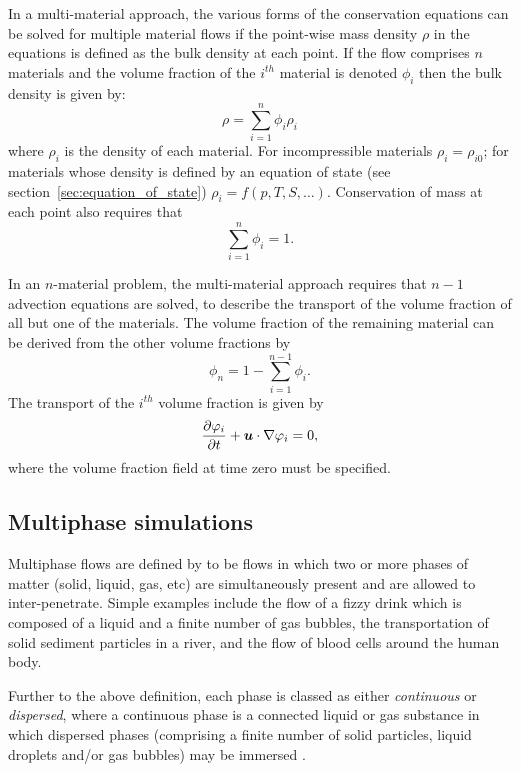 In a multi-material approach, the various forms of the conservation equations can be solved for multiple material flows if the point-wise mass density $\rho$ in the equations is defined as the bulk density at each point.  If the flow comprises $n$ materials and the volume fraction of the $i^{th}$ material is denoted $\phi_i$ then the bulk density is given by:
\begin{equation}
\rho = \sum_{i=1}^n \phi_i\rho_i
\end{equation}
where $\rho_i$ is the density of each material.  For incompressible materials $\rho_i = \rho_{i0}$; for materials whose density is defined by an equation of state (see section~\ref{sec:equation_of_state}) $\rho_i = f(p,T,S,\ldots)$.  Conservation of mass at each point also requires that
\begin{equation}
\sum_{i=1}^n \phi_{i} = 1.
\end{equation}

In an $n$-material problem, the multi-material approach requires that $n-1$ advection equations are solved, to describe the transport of the volume fraction of all but one of the materials.  The volume fraction of the remaining material can be derived from the other volume fractions by
\begin{equation}\label{diagnosticvolfrac}
\phi_{n} = 1 - \sum_{i=1}^{n-1}\phi_{i}. 
\end{equation}
The transport of the $i^{th}$ volume fraction is given by  
\begin{equation}
\frac{\partial\varphi_i}{\partial t} + {\mbox{\boldmath$u$}}\cdot\nabla\varphi_i = 0,
\end{equation}
where the volume fraction field at time zero must be specified.

\subsection{Multiphase simulations}
\label{sec:multiphase_equations}
Multiphase flows are defined by \cite{prosperettiEtAl2007} to be flows in which two or more phases of matter (solid, liquid, gas, etc) are simultaneously present and are allowed to inter-penetrate. Simple examples include the flow of a fizzy drink which is composed of a liquid and a finite number of gas bubbles, the transportation of solid sediment particles in a river, and the flow of blood cells around the human body.

Further to the above definition, each phase is classed as either \textit{continuous} or \textit{dispersed}, where a continuous phase is a connected liquid or gas substance in which dispersed phases (comprising a finite number of solid particles, liquid droplets and/or gas bubbles) may be immersed \citep{croweEtAl1998}.

